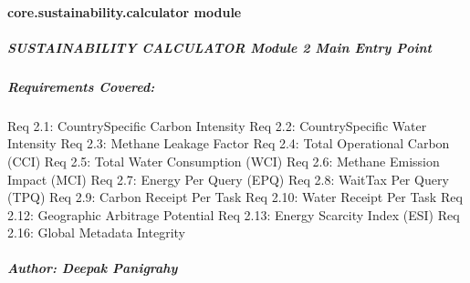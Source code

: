 \documentclass[letterpaper,10pt,english]{sphinxmanual}
\begin{document}
\paragraph{core.sustainability.calculator module}
\label{\detokenize{core.sustainability.calculator:module-core.sustainability.calculator}}\label{\detokenize{core.sustainability.calculator:core-sustainability-calculator-module}}\label{\detokenize{core.sustainability.calculator::doc}}

\subparagraph{SUSTAINABILITY CALCULATOR \textendash{} Module 2 Main Entry Point}
\label{\detokenize{core.sustainability.calculator:sustainability-calculator-module-2-main-entry-point}}

\subparagraph{Requirements Covered:}
\label{\detokenize{core.sustainability.calculator:requirements-covered}}
\sphinxAtStartPar
Req 2.1: Country\sphinxhyphen{}Specific Carbon Intensity
Req 2.2: Country\sphinxhyphen{}Specific Water Intensity
Req 2.3: Methane Leakage Factor
Req 2.4: Total Operational Carbon (CCI)
Req 2.5: Total Water Consumption (WCI)
Req 2.6: Methane Emission Impact (MCI)
Req 2.7: Energy Per Query (EPQ)
Req 2.8: Wait\sphinxhyphen{}Tax Per Query (TPQ)
Req 2.9: Carbon Receipt Per Task
Req 2.10: Water Receipt Per Task
Req 2.12: Geographic Arbitrage Potential
Req 2.13: Energy Scarcity Index (ESI)
Req 2.16: Global Metadata Integrity


\subparagraph{Author: Deepak Panigrahy}
\label{\detokenize{core.sustainability.calculator:author-deepak-panigrahy}}
\end{document}
